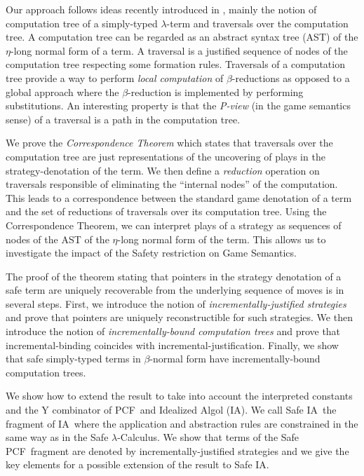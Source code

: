 \documentclass[12pt]{article}
\newcommand\ialgol{\textsf{IA}}
\newcommand\pcf{\textsf{PCF}}
\begin{document}
Our approach follows ideas recently introduced in
\cite{OngLics2006}, mainly the notion of computation tree of a
simply-typed $\lambda$-term and traversals over the computation
tree. A computation tree can be regarded as an abstract syntax tree
(AST) of the $\eta$-long normal form of a term. A traversal is a
justified sequence of nodes of the computation tree respecting some
formation rules.  Traversals of a computation tree provide a way to
perform \emph{local computation} of $\beta$-reductions as opposed to
a global approach where the $\beta$-reduction is implemented by
performing substitutions. An interesting property is that the
\emph{P-view} (in the game semantics sense) of a traversal is a path
in the computation tree.

We prove the \emph{Correspondence Theorem} which states that
traversals over the computation tree are just representations of the
uncovering of plays in the strategy-denotation of the term. We then
define a \emph{reduction} operation on traversals responsible of
eliminating the ``internal nodes'' of the computation. This leads to
a correspondence between the standard game denotation of a term and
the set of reductions of traversals over its computation tree. Using
the Correspondence Theorem, we can interpret plays of a strategy as
sequences of nodes of the AST of the $\eta$-long normal form of the
term. This allows us to investigate the impact of the Safety
restriction on Game Semantics.

The proof of the theorem stating that pointers in the strategy
denotation of a safe term are uniquely recoverable from the
underlying sequence of moves is in several steps. First, we
introduce the notion of \emph{incrementally-justified strategies}
and prove that pointers are uniquely reconstructible for such
strategies. We then introduce the notion of
\emph{incrementally-bound computation trees} and prove that
incremental-binding coincides with incremental-justification.
Finally, we show that safe simply-typed terms in $\beta$-normal form
have incrementally-bound computation trees.


We show how to extend the result to take into account the
interpreted constants and the Y combinator of \pcf\ and Idealized
Algol (\ialgol). We call Safe \ialgol\ the fragment of \ialgol\
where the application and abstraction rules are constrained in the
same way as in the Safe $\lambda$-Calculus. We show that terms of
the Safe \pcf\ fragment are denoted by incrementally-justified
strategies and we give the key elements for a possible extension of
the result to Safe \ialgol.



\end{document}
